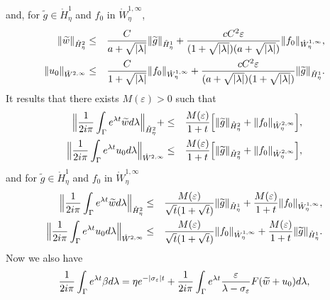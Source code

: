 \documentclass[11pt]{article}
\begin{document}
and, for $\widetilde{g}\in \mathring{H}_{\eta}^{1}$ and $f_{0}$ in $\mathring{W}%
_{\eta}^{1,\infty }$,
\begin{eqnarray*}
\|\widetilde{w}\|_{\mathring{H}_{\eta}^{2}} &\leq &\frac{C}{a +%
\sqrt{|\lambda |}}\|\widetilde{g}\|_{\mathring{H}_{\eta}^{1}}+\frac{%
cC^{2}\varepsilon }{(1 +\sqrt{|\lambda |})(a+\sqrt{|\lambda
|})}\|f_{0}\|_{\mathring{W}_{\eta}^{1,\infty }}, \\
\|u_{0}\|_{\mathring{W}^{2,\infty }} &\leq &\frac{C}{1 +%
\sqrt{|\lambda |}}\|f_{0}\|_{\mathring{W}_{\eta}^{1,\infty }}+\frac{%
cC^{2}\varepsilon }{(a+\sqrt{|\lambda |})(1 +\sqrt{|\lambda
|})}\|\widetilde{g}\|_{\mathring{H}_{\eta}^{1}}.
\end{eqnarray*}%
It results that there exists $M(\varepsilon)>0$ such that 
\begin{eqnarray*}
\Bigl\|\frac{1}{2i\pi }\int_{\Gamma }e^{\lambda t}\widetilde{w}d\lambda \Bigr\|_{%
\mathring{H}_{\eta}^{2}} 
+ &\leq &\frac{M(\varepsilon )}{1+t} \Bigl[\|\widetilde{g}\|_{%
\mathring{H}_{\eta}^{2}}+\|f_{0}\|_{\mathring{%
W}_{\eta}^{2,\infty }} \Bigr], \\
\Bigl\|\frac{1}{2i\pi }\int_{\Gamma }e^{\lambda t}u_{0}d\lambda \Bigr\|_{\mathring{W}%
^{2,\infty }} &\leq &\frac{M(\varepsilon )}{1+t}
\Bigl[\|\widetilde{g}\|_{\mathring{%
H}_{\eta}^{2}} +\|f_{0}\|_{\mathring{W}%
_{\eta}^{2,\infty }} \Bigr],
\end{eqnarray*}%
and for $\widetilde{g}\in \mathring{H}_{\eta}^{1}$ and $f_{0}$ in $\mathring{W}%
_{\eta}^{1,\infty }$%
\begin{eqnarray*}
\Bigl\|\frac{1}{2i\pi }\int_{\Gamma }e^{\lambda t}\widetilde{w}d\lambda \Bigr\|_{%
\mathring{H}_{\eta}^{2}} &\leq &\frac{M(\varepsilon )}{\sqrt{t} (1 + \sqrt{t})}\|\widetilde{g}%
\|_{\mathring{H}_{\eta}^{1}}+\frac{M(\varepsilon )}{1+t}\|f_{0}\|_{\mathring{W}%
_{\eta}^{1,\infty }}, \\
\Bigl\|\frac{1}{2i\pi }\int_{\Gamma }e^{\lambda t}u_{0}d\lambda \Bigr\|_{\mathring{W}%
^{2,\infty }} &\leq &\frac{M(\varepsilon )}{\sqrt{t}(1 + \sqrt{t})}\|f_{0}\|_{\mathring{W}%
_{\eta}^{1,\infty }}+\frac{M(\varepsilon )}{1+t}\|\widetilde{g}\|_{\mathring{H}%
_{\eta}^{1}}.
\end{eqnarray*}%
Now we also have%
\begin{equation*}
\frac{1}{2i\pi }\int_{\Gamma }e^{\lambda t}\beta d\lambda =\eta e^{-|\sigma
_{\varepsilon }|t}+\frac{1}{2i\pi }\int_{\Gamma }e^{\lambda t}\frac{%
\varepsilon }{\lambda -\sigma _{\varepsilon }}F(\widetilde{w}+u_{0})d\lambda
,
\end{equation*}%
\end{document}
